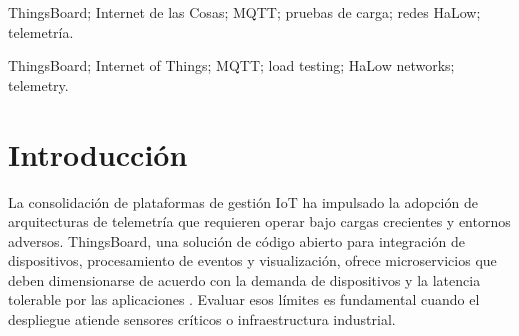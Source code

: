 ﻿\documentclass[conference]{IEEEtran}
\begin{document}
\begin{otherlanguage}{english}
\begin{abstract}
\textbf{Abstract---} This thesis reports the performance and stability assessment of a ThingsBoard server deployed on a custom HaLow network that isolates IoT telemetry traffic. The load generation pipeline relies on asynchronous Python scripts to provision, activate, and publish simulated devices over MQTT. Test campaigns with up to 500 concurrent clients measured throughput, end-to-end latency, error rates, and resource consumption on the server. Metrics were stored as CSV files under \texttt{data/metrics/} and JSONL streams under \texttt{data/logs/}, enabling reproducible analyses without third-party dashboards. The platform sustained average latencies below \SI{5}{\milli\second} and \num{20} msg/s with 20 clients, and handled 200 clients while keeping averages under \SI{15}{\milli\second}. Increasing concurrency to 400 clients caused backlog formation and latencies near \SI{180}{\milli\second} when the MQTT broker shared resources with the database. After isolating vCPUs and prioritising MQTT queues the system scaled to 500 clients with latencies below \SI{10}{\milli\second}. The study documents the limits before degradation, proposes mitigation strategies, and automates the generation of reproducible reports.
\end{abstract}
\end{otherlanguage}

\begin{IEEEkeywords}
ThingsBoard; Internet de las Cosas; MQTT; pruebas de carga; redes HaLow; telemetr\'ia.
\end{IEEEkeywords}

\begin{otherlanguage}{english}
\begin{IEEEkeywords}
ThingsBoard; Internet of Things; MQTT; load testing; HaLow networks; telemetry.
\end{IEEEkeywords}
\end{otherlanguage}

\renewcommand{\contentsname}{\'Indice / Table of contents}
\tableofcontents
\bigskip

\section{Introducci\'on}
La consolidaci\'on de plataformas de gesti\'on IoT ha impulsado la adopci\'on de arquitecturas de telemetr\'ia que requieren operar bajo cargas crecientes y entornos adversos. ThingsBoard, una soluci\'on de c\'odigo abierto para integraci\'on de dispositivos, procesamiento de eventos y visualizaci\'on, ofrece microservicios que deben dimensionarse de acuerdo con la demanda de dispositivos y la latencia tolerable por las aplicaciones \cite{thingsboard-docs}. Evaluar esos l\'imites es fundamental cuando el despliegue atiende sensores cr\'iticos o infraestructura industrial.
\end{document}
